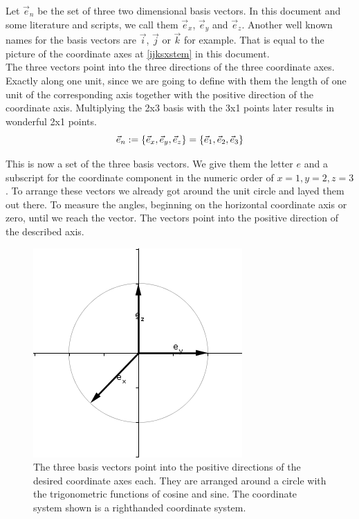 \documentclass[a4paper]{article}
\begin{document}
\begin{Example}
Let $\vec{e}_{n}$ be the set of three two dimensional basis vectors. In this document and some literature and scripts,
we call them $\vec{e}_x$, $\vec{e}_y$ and $\vec{e}_z$. Another well known names for the basis vectors are $\vec{i}$, 
$\vec{j}$ or $\vec{k}$ for example. That is equal to the picture of the coordinate axes at \ref{ijksxstem} in this document.\\

The three vectors point into the three directions of the three coordinate axes. Exactly along one unit, since we are going
to define with them the length of one unit of the corresponding axis together with the positive direction of the coordinate axis.
Multiplying the 2x3 basis with the 3x1 points later results in wonderful 2x1 points. \\

\begin{displaymath}
\vec{e}_{n} := \{\vec{e}_x, \vec{e}_y, \vec{e}_z\} = \{\vec{e}_1, \vec{e}_2, \vec{e}_3\}\\
\end{displaymath} 

This is now a set of the three basis vectors. We give them the letter $e$ and a subscript for the coordinate component in the numeric order of $x=1, y=2, z=3$. To arrange these vectors we already got around the unit circle and layed them out there. To measure the angles, beginning on the horizontal coordinate axis or zero, until we reach the vector. The vectors point into the positive direction of the described axis.\\

\begin{figure}[ht]
\includegraphics[scale=0.8]{righthand45.png}
\caption{The three basis vectors point into the positive directions of the desired coordinate axes each. They are arranged around a circle with the trigonometric functions of cosine and sine. The coordinate system shown is a righthanded coordinate system.}
\end{figure}


\end{Example}
\end{document}

